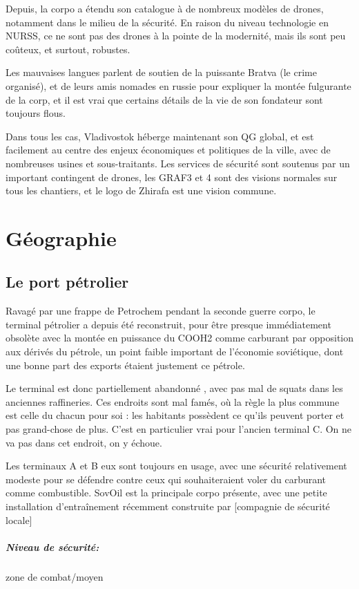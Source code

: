 \documentclass[10pt,a4paper]{book}
\begin{document}
Depuis, la corpo a étendu son catalogue à de nombreux modèles de drones, notamment dans le milieu de la sécurité. En raison du niveau technologie en NURSS, ce ne sont pas des drones à la pointe de la modernité, mais ils sont peu coûteux, et surtout, robustes.

Les mauvaises langues parlent de soutien de la puissante Bratva (le crime organisé), et de leurs amis nomades en russie pour expliquer la montée fulgurante de la corp, et il est vrai que certains détails de la vie de son fondateur sont toujours flous.

Dans tous les cas, Vladivostok héberge maintenant son QG global, et est facilement au centre des enjeux économiques et politiques de la ville, avec de nombreuses usines et sous-traitants. Les services de sécurité sont soutenus par un important contingent de drones, les GRAF3 et 4 sont des visions normales sur tous les chantiers, et le logo de Zhirafa est une vision commune.
\chapter{Géographie}
\section{Le port pétrolier}
Ravagé par une frappe de Petrochem pendant la seconde guerre corpo, le terminal pétrolier a depuis été reconstruit, pour être presque immédiatement obsolète avec la montée en puissance du COOH2 comme carburant par opposition aux dérivés du pétrole, un point faible important de l'économie soviétique, dont une bonne part des exports étaient justement ce pétrole. 

Le terminal est donc partiellement abandonné , avec pas mal de squats dans les anciennes raffineries. Ces endroits sont mal famés, où la règle la plus commune est celle du chacun pour soi : les habitants possèdent ce qu'ils peuvent porter et pas grand-chose de plus. C'est en particulier vrai pour l'ancien terminal C. On ne va pas dans cet endroit, on y échoue.

Les terminaux A et B eux sont toujours en usage, avec une sécurité relativement modeste pour se défendre contre ceux qui souhaiteraient voler du carburant comme combustible. SovOil est la principale corpo présente, avec une petite installation d'entraînement récemment construite par [compagnie de sécurité locale]
\paragraph{Niveau de sécurité:} zone de combat/moyen
\end{document}
